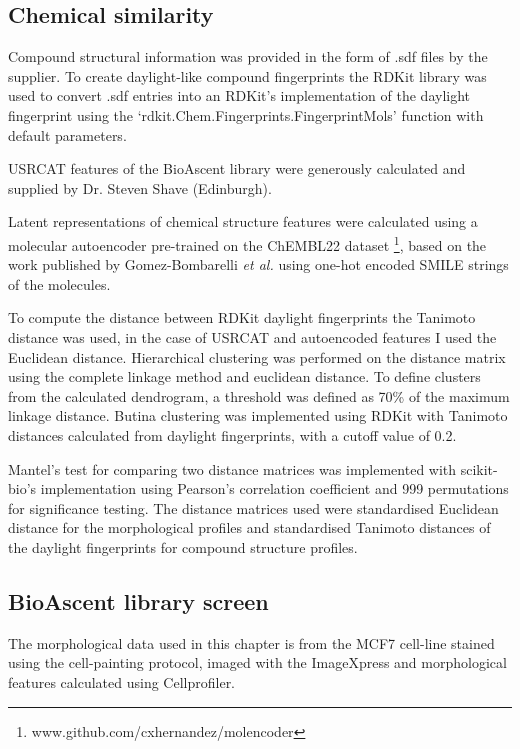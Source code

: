 \documentclass[a4paper,11pt,twoside,openright]{scrbook}
\begin{document}
\subsection{Chemical similarity}

Compound structural information was provided in the form of .sdf files by the supplier.
To create daylight-like compound fingerprints the RDKit library was used to convert .sdf entries into an RDKit's 
implementation of the daylight fingerprint using the `rdkit.Chem.Fingerprints.FingerprintMols' function with default 
parameters.

USRCAT features of the BioAscent library were generously calculated and supplied by Dr. Steven Shave (Edinburgh).

Latent representations of chemical structure features were calculated using a molecular autoencoder pre-trained on the 
ChEMBL22 dataset \footnote{www.github.com/cxhernandez/molencoder}, based on the work published by Gomez-Bombarelli 
\textit{et al.} \cite{Gomez-Bombarelli2016} using one-hot encoded SMILE strings of the molecules.

To compute the distance between RDKit daylight fingerprints the Tanimoto distance was used, in the case of USRCAT and 
autoencoded features I used the Euclidean distance.
Hierarchical clustering was performed on the distance matrix using the complete linkage method and euclidean distance.
To define clusters from the calculated dendrogram, a threshold was defined as 70\% of the maximum linkage distance.
Butina clustering was implemented using RDKit with Tanimoto distances calculated from daylight fingerprints, with a 
cutoff value of 0.2.

Mantel's test for comparing two distance matrices was implemented with scikit-bio's implementation using Pearson's 
correlation coefficient and 999 permutations for significance testing.
The distance matrices used were standardised Euclidean distance for the morphological profiles and standardised 
Tanimoto distances of the daylight fingerprints for compound structure profiles.


\subsection{BioAscent library screen}

The morphological data used in this chapter is from the MCF7 cell-line stained using the cell-painting protocol, imaged 
with the ImageXpress and morphological features calculated using Cellprofiler.
\end{document}
